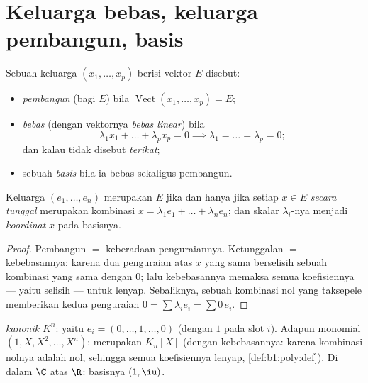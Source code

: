 \section{Keluarga bebas, keluarga pembangun, basis}

\begin{definition}\label{def:b1:vspaces:free}
Sebuah keluarga $(x_1, \dots, x_p)$ berisi vektor $E$ disebut:
\begin{itemize}
  \item \emph{pembangun} (bagi $E$) bila
        $\operatorname{Vect}(x_1,\dots,x_p) = E$;
  \item \emph{bebas} (dengan vektornya \emph{bebas
        linear}) bila
        \[
        \lambda_1 x_1 + \dots + \lambda_p x_p = 0
        \implies \lambda_1 = \dots = \lambda_p = 0 ;
        \]
        dan kalau tidak disebut \emph{terikat};
  \item sebuah \emph{basis} bila ia bebas sekaligus pembangun.
\end{itemize}
\end{definition}

\begin{proposition}[Koordinat]\label{prop:b1:vspaces:coordinates}
Keluarga $(e_1, \dots, e_n)$ merupakan  $E$ jika dan hanya jika setiap $x \in E$
\emph{secara tunggal} merupakan kombinasi $x = \lambda_1 e_1 + \dots +
\lambda_n e_n$; dan skalar $\lambda_i$-nya menjadi
\emph{koordinat} $x$ pada basisnya.
\end{proposition}

\begin{proof}
Pembangun $=$ keberadaan penguraiannya. Ketunggalan $=$
kebebasannya: karena dua penguraian atas $x$ yang sama berselisih sebuah kombinasi
yang sama dengan $0$; lalu kebebasannya memaksa semua koefisiennya --- yaitu
selisih  --- untuk lenyap. Sebaliknya, sebuah kombinasi
nol yang taksepele memberikan kedua penguraian $0 = \sum \lambda_i
e_i = \sum 0\,e_i$.
\end{proof}

\begin{example}\label{ex:b1:vspaces:bases}
\emph{ kanonik} $K^n$: yaitu $e_i = (0, \dots, 1, \dots, 0)$
(dengan $1$ pada slot $i$). Adapun monomial $(1, X, X^2, \dots, X^n)$: merupakan 
$K_n[X]$ (dengan kebebasannya: karena kombinasi nolnya adalah  nol, sehingga
semua koefisiennya lenyap, \cref{def:b1:poly:def}). Di dalam
$\C$ atas $\R$: basisnya $(1, \iu)$.
\end{example}

